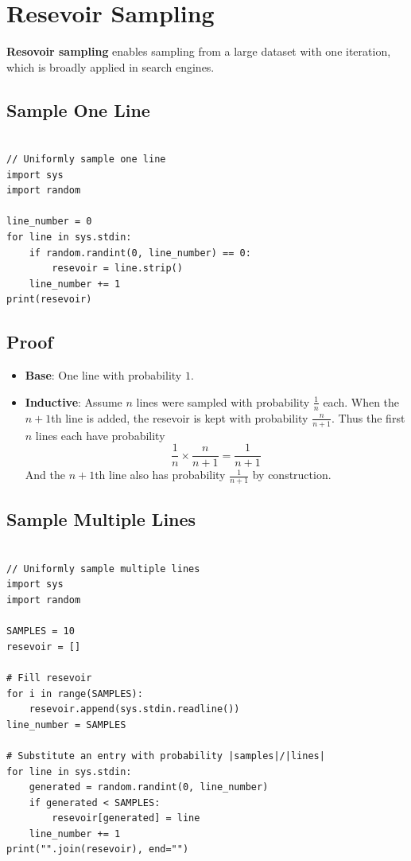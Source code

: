 \documentclass[a3paper, 12pt]{book} %
\begin{document}
\section{Resevoir Sampling}
\textbf{Resovoir sampling} enables sampling from a large dataset with one iteration, which is broadly applied in search engines.

\subsection{Sample One Line}
\begin{lstlisting}

// Uniformly sample one line
import sys
import random

line_number = 0
for line in sys.stdin:
	if random.randint(0, line_number) == 0:
		resevoir = line.strip()
	line_number += 1
print(resevoir)
\end{lstlisting}

\subsection{Proof}
\begin{itemize}
	\item \textbf{Base}: One line with probability $1$.
	\item \textbf{Inductive}: Assume $n$ lines were sampled with probability $\frac{1}{n}$ each.
	When the $n + 1$th line is added, the resevoir is kept with probability $\frac{n}{n+1}$. Thus the first $n$ lines each have probability 
	$$\frac{1}{n} \times \frac{n}{n+1}=\frac{1}{n+1}$$
	And the $n+1$th line also has probability $\frac{1}{n+1}$ by construction.
\end{itemize}

\subsection{Sample Multiple Lines}
\begin{lstlisting}

// Uniformly sample multiple lines
import sys
import random

SAMPLES = 10
resevoir = []

# Fill resevoir
for i in range(SAMPLES):
	resevoir.append(sys.stdin.readline())
line_number = SAMPLES

# Substitute an entry with probability |samples|/|lines|
for line in sys.stdin:
	generated = random.randint(0, line_number)
	if generated < SAMPLES:
		resevoir[generated] = line
	line_number += 1
print("".join(resevoir), end="")
\end{lstlisting}
\end{document}
